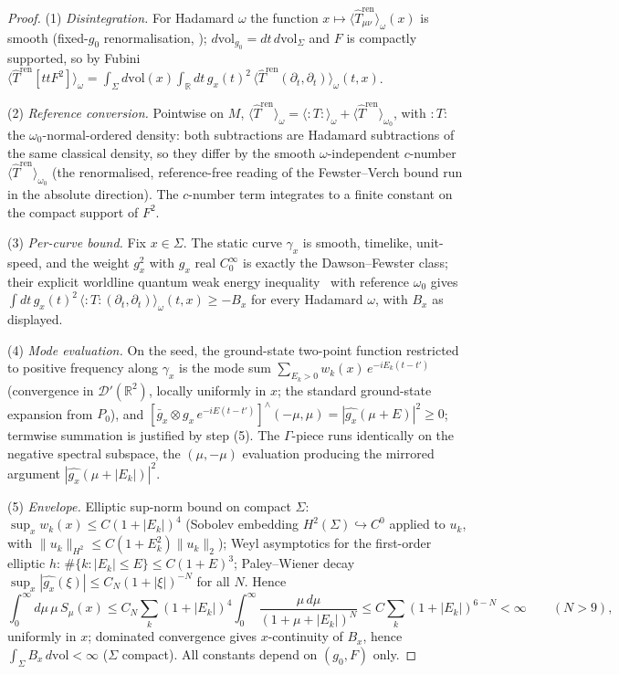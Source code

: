 \begin{proof}
(1) \emph{Disintegration.} For Hadamard $\omega$ the function
$x\mapsto\langle\widehat T^{\mathrm{ren}}_{\mu\nu}\rangle_\omega(x)$
is smooth (fixed-$g_0$ renormalisation,
\cite{DappiaggiHackPinamonti2009});
$d\mathrm{vol}_{g_0}=dt\,d\mathrm{vol}_\Sigma$ and $F$ is compactly
supported, so by Fubini
$\langle\widehat T^{\mathrm{ren}}[ttF^{2}]\rangle_\omega
=\int_\Sigma d\mathrm{vol}(x)\int_{\mathbb R}dt\,g_x(t)^{2}\,
\langle\widehat T^{\mathrm{ren}}(\partial_t,\partial_t)
\rangle_\omega(t,x)$.

(2) \emph{Reference conversion.} Pointwise on $M$,
$\langle\widehat T^{\mathrm{ren}}\rangle_\omega
=\langle{:}T{:}\rangle_\omega
+\langle\widehat T^{\mathrm{ren}}\rangle_{\omega_0}$, with
${:}T{:}$ the $\omega_0$-normal-ordered density: both subtractions
are Hadamard subtractions of the same classical density, so they
differ by the smooth $\omega$-independent $c$-number
$\langle\widehat T^{\mathrm{ren}}\rangle_{\omega_0}$ (the
renormalised, reference-free reading of the Fewster--Verch bound run
in the absolute direction). The $c$-number term integrates to a
finite constant on the compact support of $F^{2}$.

(3) \emph{Per-curve bound.} Fix $x\in\Sigma$. The static curve
$\gamma_x$ is smooth, timelike, unit-speed, and the weight $g_x^{2}$
with $g_x$ real $C_0^\infty$ is exactly the Dawson--Fewster class;
their explicit worldline quantum weak energy
inequality~\cite{DawsonFewster2006} with reference $\omega_0$ gives
$\int dt\,g_x(t)^{2}\,\langle{:}T{:}(\partial_t,\partial_t)
\rangle_\omega(t,x)\ge-B_x$ for every Hadamard $\omega$, with $B_x$
as displayed.

(4) \emph{Mode evaluation.} On the seed, the ground-state two-point
function restricted to positive frequency along $\gamma_x$ is the
mode sum $\sum_{E_k>0}w_k(x)\,e^{-iE_k(t-t')}$ (convergence in
$\mathscr D'(\mathbb R^{2})$, locally uniformly in $x$; the standard
ground-state expansion from $P_0$), and
$[\bar g_x\otimes g_x\,e^{-iE(t-t')}]^{\wedge}(-\mu,\mu)
=|\widehat{g_x}(\mu+E)|^{2}\ge0$; termwise summation is justified by
step (5). The $\Gamma$-piece runs identically on the negative
spectral subspace, the $(\mu,-\mu)$ evaluation producing the
mirrored argument $|\widehat{g_x}(\mu+|E_k|)|^{2}$.

(5) \emph{Envelope.} Elliptic sup-norm bound on compact $\Sigma$:
$\sup_x w_k(x)\le C(1+|E_k|)^{4}$ (Sobolev embedding
$H^{2}(\Sigma)\hookrightarrow C^{0}$ applied to $u_k$, with
$\|u_k\|_{H^{2}}\le C(1+E_k^{2})\|u_k\|_{2}$); Weyl asymptotics for
the first-order elliptic $h$: $\#\{k:|E_k|\le E\}\le C(1+E)^{3}$;
Paley--Wiener decay $\sup_x|\widehat{g_x}(\xi)|\le
C_N(1+|\xi|)^{-N}$ for all $N$. Hence
\[
\int_0^\infty\!d\mu\,\mu\,S_\mu(x)\le
C_N\sum_k(1+|E_k|)^{4}\int_0^\infty
\frac{\mu\,d\mu}{(1+\mu+|E_k|)^{N}}
\le C\sum_k(1+|E_k|)^{6-N}<\infty\qquad(N>9),
\]
uniformly in $x$; dominated convergence gives $x$-continuity of
$B_x$, hence $\int_\Sigma B_x\,d\mathrm{vol}<\infty$ ($\Sigma$
compact). All constants depend on $(g_0,F)$ only.


\end{proof}
